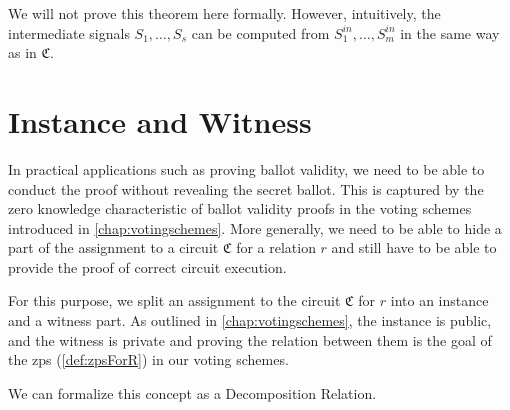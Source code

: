 We will not prove this theorem here formally.
However, intuitively, the intermediate signals $S_1,\dots, S_s$ can be computed from $S_1^{in},\dots, S_m^{in}$ in the same way as in $\mathfrak{C}$.

\section{Instance and Witness}
\label{section:proofSchemes:instanceAndWitness}
In practical applications such as proving ballot validity, we need to be able to conduct the proof without revealing the secret ballot. 
This is captured by the zero knowledge characteristic of ballot validity proofs in the voting schemes introduced in \cref{chap:votingschemes}.
More generally, we need to be able to hide a part of the assignment to a circuit $\mathfrak{C}$ for a relation $r$ and still have to be able to provide the proof of correct circuit execution.

For this purpose, we split an assignment to the circuit $\mathfrak{C}$ for $r$ into an instance and a witness part. 
As outlined in \cref{chap:votingschemes}, the instance is public, and the witness is private and proving the relation between them is the goal of the \gls{zps} (\cref{def:zpsForR}) in our voting schemes.

We can formalize this concept as a Decomposition Relation.

